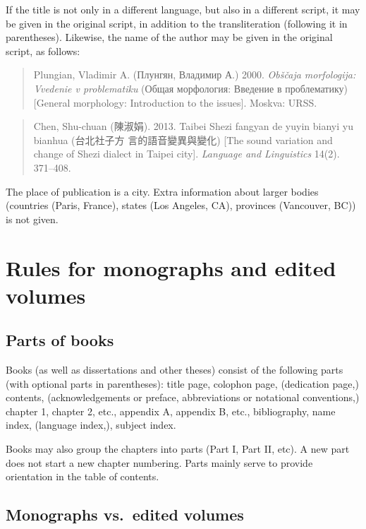 \documentclass[a4paper]{article}
\newcommand{\zh}[1]{{\cn #1}}
\newenvironment{gsrexq}{\begin{quote}\color{blue}}{\end{quote}}
\begin{document}
If the title is not only in a different language, but also in a
different script, it may be given in the original script, in addition to
the transliteration (following it in parentheses). Likewise, the name of
the author may be given in the original script, as follows:


\begin{gsrexq}
Plungian, Vladimir A. (Плунгян, Владимир А.) 2000. 
\textit{Obščaja morfologija: Vvedenie v problematiku}
(Общая морфология: Введение в проблематику) 
[General morphology: Introduction to the issues]. 
Moskva: URSS. 
\end{gsrexq}


\begin{gsrexq}
Chen, Shu-chuan (\zh{陳淑娟}). 2013. Taibei Shezi fangyan de yuyin bianyi yu bianhua
(\zh{台北社子方 言的語音變異與變化}) 
[The sound variation and change of Shezi dialect in Taipei city]. 
\textit{Language and Linguistics} 14(2). 371--408.
\end{gsrexq}


The place of publication is a city. Extra information about larger
bodies (countries (Paris, France), states (Los Angeles, CA), provinces
(Vancouver, BC)) is not given.

\section{Rules for monographs and edited volumes}\label{{sec:monoev}}

\subsection{Parts of books}\label{sec:parts-of-books}

Books (as well as dissertations and other theses) consist of the
following parts (with optional parts in parentheses): title page,
colophon page, (dedication page,) contents, (acknowledgements or
preface, abbreviations or notational conventions,) chapter 1, chapter 2,
etc., appendix A, appendix B, etc., bibliography, name index, (language
index,), subject index. 

Books may also group the chapters into parts
(Part I, Part II, etc). A new part does not start a new chapter
numbering. Parts mainly serve to provide orientation in the table of
contents.

\subsection{Monographs vs.~edited volumes}\label{sec:monoev}
\end{document}
